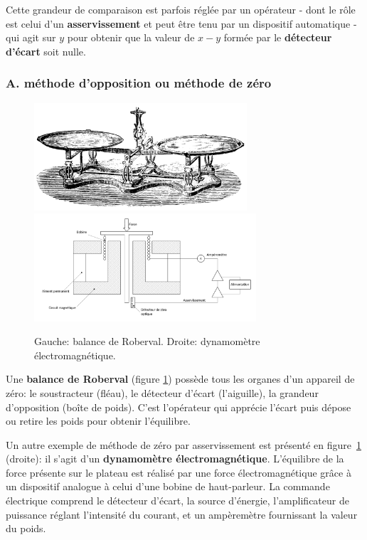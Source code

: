 Cette grandeur de comparaison est parfois réglée par un opérateur - dont le rôle est celui d'un \textbf{asservissement} et peut être tenu par un dispositif automatique - qui agit sur $y$ pour obtenir que la valeur de $x-y$ formée par le \textbf{détecteur d'écart} soit nulle.

\subsubsection{A. méthode d'opposition ou méthode de zéro}

\begin{figure}[h]
   \centering
   \includegraphics[height=4cm]{assets/figures/balande-roberval.pdf}\hspace{5mm}
   \includegraphics[height=4cm]{assets/figures/dynamo.pdf}
   \caption{Gauche: balance de Roberval. Droite: dynamomètre électromagnétique.}
   \label{fig:balance}
\end{figure}
Une \textbf{balance de Roberval} (figure \ref{fig:balance}) possède tous les organes d'un appareil de zéro: le soustracteur (fléau), le détecteur d'écart (l'aiguille), la grandeur d'opposition (boîte de poids). C'est l'opérateur qui apprécie l'écart puis dépose ou retire les poids pour obtenir l'équilibre.

Un autre exemple de méthode de zéro par asservissement est présenté en figure~\ref{fig:balance} (droite): il s'agit d'un \textbf{dynamomètre électromagnétique}. L'équilibre de la force présente sur le plateau est réalisé par une force électromagnétique grâce à un dispositif analogue à celui d'une bobine de haut-parleur. La commande électrique comprend le détecteur d'écart, la source d'énergie, l'amplificateur de puissance réglant l'intensité du courant, et un ampèremètre fournissant la valeur du poids.

